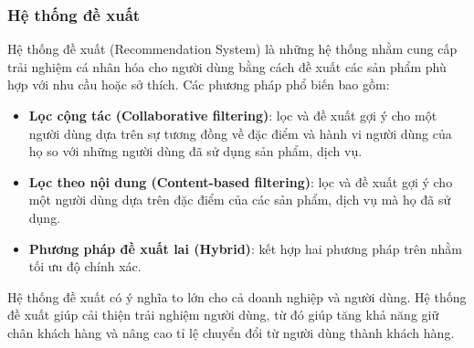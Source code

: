 \subsubsection{Hệ thống đề xuất}
Hệ thống đề xuất (Recommendation System) là những hệ thống nhằm cung cấp trải nghiệm cá nhân hóa cho người dùng bằng cách đề xuất các sản phẩm phù hợp với nhu cầu hoặc sở thích. Các phương pháp phổ biến bao gồm:

\begin{itemize}
    \item \textbf{Lọc cộng tác (Collaborative filtering)}: lọc và đề xuất gợi ý cho một người dùng dựa trên sự tương đồng về đặc điểm và hành vi người dùng của họ so với những người dùng đã sử dụng sản phẩm, dịch vụ\cite{c4-rs}.
    \item \textbf{Lọc theo nội dung (Content-based filtering)}: lọc và đề xuất gợi ý cho một người dùng dựa trên đặc điểm của các sản phẩm, dịch vụ mà họ đã sử dụng\cite{c4-rs}.
    \item \textbf{Phương pháp đề xuất lai (Hybrid)}: kết hợp hai phương pháp trên nhằm tối ưu độ chính xác\cite{c4-rs}.
\end{itemize}

Hệ thống đề xuất có ý nghĩa to lớn cho cả doanh nghiệp và người dùng. Hệ thống đề xuất giúp cải thiện trải nghiệm người dùng, từ đó giúp tăng khả năng giữ chân khách hàng và nâng cao tỉ lệ chuyển đổi từ người dùng thành khách hàng\cite{c4-rs}. 